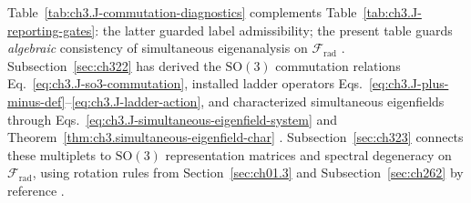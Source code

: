 Table~\ref{tab:ch3.J-commutation-diagnostics} complements Table~\ref{tab:ch3.J-reporting-gates}: the latter
guarded label admissibility; the present table guards \emph{algebraic} consistency of simultaneous
eigenanalysis on \(\mathcal{F}_{\mathrm{rad}}\) .
Subsection~\ref{sec:ch322} has derived the \(\mathrm{SO}(3)\) commutation relations
Eq.~\eqref{eq:ch3.J-so3-commutation}, installed ladder operators
Eqs.~\eqref{eq:ch3.J-plus-minus-def}--\eqref{eq:ch3.J-ladder-action}, and characterized simultaneous eigenfields
through Eqs.~\eqref{eq:ch3.J-simultaneous-eigenfield-system} and
Theorem~\ref{thm:ch3.simultaneous-eigenfield-char} .
Subsection~\ref{sec:ch323} connects these multiplets to \(\mathrm{SO}(3)\) representation matrices and
spectral degeneracy on \(\mathcal{F}_{\mathrm{rad}}\), using rotation rules from Section~\ref{sec:ch01.3} and
Subsection~\ref{sec:ch262} by reference .
